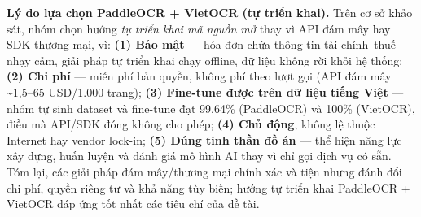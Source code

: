 \textbf{Lý do lựa chọn PaddleOCR + VietOCR (tự triển khai).} Trên cơ sở khảo sát, nhóm chọn hướng \emph{tự triển khai mã nguồn mở} thay vì API đám mây hay SDK thương mại, vì: \textbf{(1) Bảo mật} — hóa đơn chứa thông tin tài chính–thuế nhạy cảm, giải pháp tự triển khai chạy offline, dữ liệu không rời khỏi hệ thống; \textbf{(2) Chi phí} — miễn phí bản quyền, không phí theo lượt gọi (API đám mây \textasciitilde{}1,5–65 USD/1.000 trang); \textbf{(3) Fine-tune được trên dữ liệu tiếng Việt} — nhóm tự sinh dataset và fine-tune đạt 99,64\% (PaddleOCR) và 100\% (VietOCR), điều mà API/SDK đóng không cho phép; \textbf{(4) Chủ động}, không lệ thuộc Internet hay vendor lock-in; \textbf{(5) Đúng tinh thần đồ án} — thể hiện năng lực xây dựng, huấn luyện và đánh giá mô hình AI thay vì chỉ gọi dịch vụ có sẵn. Tóm lại, các giải pháp đám mây/thương mại chính xác và tiện nhưng đánh đổi chi phí, quyền riêng tư và khả năng tùy biến; hướng tự triển khai PaddleOCR + VietOCR đáp ứng tốt nhất các tiêu chí của đề tài.

